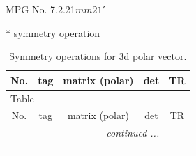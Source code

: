 \documentclass[fleqn,8pt]{jsarticle}
\begin{document}
\setcounter{MaxMatrixCols}{32}

\renewcommand{\tablename}{Table~}
\renewcommand{\figurename}{Figure~}
\begin{center}
\LARGE
MPG No. 7.2.21\quad$mm21'$
\end{center}
* symmetry operation
\renewcommand{\arraystretch}{1.3}
\begin{longtable}{ccccc}
\caption{Symmetry operations for 3d polar vector.}
 \\
 \hline \hline
No. & tag & matrix (polar) & det & TR \\ \hline \endfirsthead

\multicolumn{4}{l}{\tablename\ \thetable{}} \\
 \hline \hline
No. & tag & matrix (polar) & det & TR \\ \hline \endhead

 \hline \hline
\multicolumn{4}{r}{\footnotesize\it continued ...} \\ \endfoot

 \hline \hline
\multicolumn{4}{r}{} \\ \endlastfoot


\end{longtable}
\end{document}

